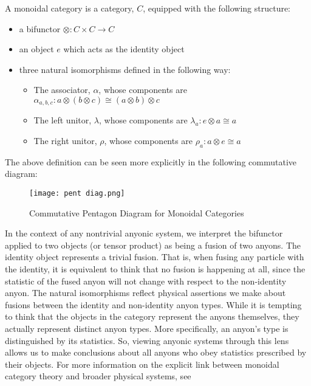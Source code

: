 \begin{definition}
	A monoidal category is a category, $C$, equipped with the following structure:
\begin{itemize}
	\item a bifunctor $\otimes:C\times C\rightarrow C$
	\item an object $e$ which acts as the identity object
	\item three natural isomorphisms defined in the following way:
		\begin{itemize}
			\item The associator, $\alpha$, whose components are $\alpha_{a,b,c}: a\otimes(b\otimes c) \cong (a\otimes b)\otimes c$
			\item The left unitor, $\lambda$, whose components are $\lambda_a : e\otimes a \cong a$
			\item The right unitor, $\rho$, whose components are $\rho_a:a\otimes e \cong a$
		\end{itemize}
\end{itemize}
\end{definition}

The above definition can be seen more explicitly in the following commutative diagram:


\begin{figure}[H]
	\centering
	\texttt{[image: pent diag.png]}
	\caption{Commutative Pentagon Diagram for Monoidal Categories}
\end{figure}


In the context of any nontrivial anyonic system, we interpret the bifunctor applied to two objects (or tensor product) as being a fusion of two anyons. The identity object represents a trivial fusion. That is, when fusing any particle with the identity, it is equivalent to think that no fusion is happening at all, since the statistic of the fused anyon will not change with respect to the non-identity anyon. The natural isomorphisms reflect physical assertions we make about fusions between the identity and non-identity anyon types. While it is tempting to think that the objects in the category represent the anyons themselves, they actually represent distinct anyon types. More specifically, an anyon's type is distinguished by its statistics. So, viewing anyonic systems through this lens allows us to make conclusions about all anyons who obey statistics prescribed by their objects. For more information on the explicit link between monoidal category theory and broader physical systems, see \cite{Rose3}

